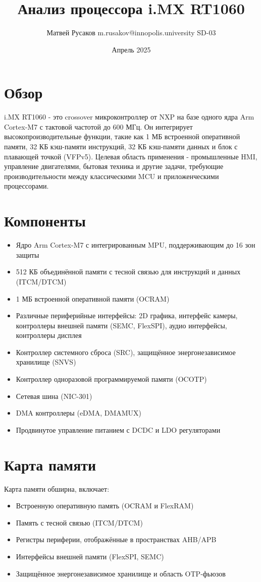 \documentclass{article}
\title{Анализ процессора i.MX RT1060}
\author{Матвей Русаков m.rusakov@innopolis.university SD-03}
\date{Апрель 2025}
\begin{document}
\maketitle



\section{Обзор}

i.MX RT1060 - это crossover микроконтроллер от NXP на базе одного ядра Arm Cortex-M7 с тактовой частотой до 600 МГц. Он интегрирует высокопроизводительные функции, такие как 1 МБ встроенной оперативной памяти, 32 КБ кэш-памяти инструкций, 32 КБ кэш-памяти данных и блок с плавающей точкой (VFPv5). Целевая область применения - промышленные HMI, управление двигателями, бытовая техника и другие задачи, требующие производительности между классическими MCU и приложенческими процессорами.

\section{Компоненты}
\begin{itemize}
    \item Ядро Arm Cortex-M7 с интегрированным MPU, поддерживающим до 16 зон защиты
    \item 512 КБ объединённой памяти с тесной связью для инструкций и данных (ITCM/DTCM)
    \item 1 МБ встроенной оперативной памяти (OCRAM)
    \item Различные периферийные интерфейсы: 2D графика, интерфейс камеры, контроллеры внешней памяти (SEMC, FlexSPI), аудио интерфейсы, контроллеры дисплея
    \item Контроллер системного сброса (SRC), защищённое энергонезависимое хранилище (SNVS)
    \item Контроллер одноразовой программируемой памяти (OCOTP)
    \item Сетевая шина (NIC-301)
    \item DMA контроллеры (eDMA, DMAMUX)
    \item Продвинутое управление питанием с DCDC и LDO регуляторами
\end{itemize}


\section{Карта памяти}
Карта памяти обширна, включает:
\begin{itemize}
    \item Встроенную оперативную память (OCRAM и FlexRAM)
    \item Память с тесной связью (ITCM/DTCM)
    \item Регистры периферии, отображённые в пространствах AHB/APB
    \item Интерфейсы внешней памяти (FlexSPI, SEMC)
    \item Защищённое энергонезависимое хранилище и область OTP-фьюзов
\end{itemize}
\end{document}
